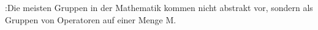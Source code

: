 
\motivation{}:{Die meisten Gruppen in der Mathematik kommen nicht abstrakt vor, 
                      sondern als Gruppen von Operatoren auf einer Menge M.}
	
